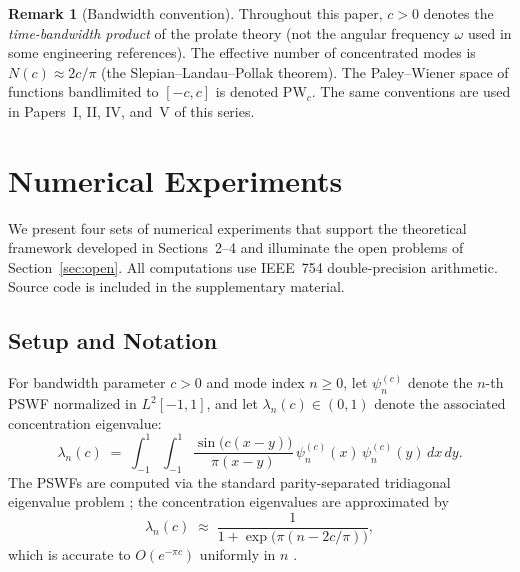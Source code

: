\documentclass[12pt,a4paper]{amsart}
\theoremstyle{definition}
\newtheorem{remark}[theorem]{Remark}
\begin{document}
\begin{remark}[Bandwidth convention]
\label{rem:bandwidth-convention}
Throughout this paper, $c > 0$ denotes the \emph{time-bandwidth product}
of the prolate theory (not the angular frequency $\omega$ used in some
engineering references). The effective number of concentrated modes is
$N(c) \approx 2c/\pi$ (the Slepian--Landau--Pollak theorem). The
Paley--Wiener space of functions bandlimited to $[-c,c]$ is denoted
$\mathrm{PW}_c$. The same conventions are used in Papers~I, II, IV, and~V
of this series.
\end{remark}

\section{Numerical Experiments}
\label{sec:numerics}

We present four sets of numerical experiments that support the
theoretical framework developed in Sections~2--4 and illuminate
the open problems of Section~\ref{sec:open}.
All computations use IEEE~754 double-precision arithmetic.
Source code is included in the supplementary material.

\subsection{Setup and Notation}
\label{ssec:setup}

For bandwidth parameter $c > 0$ and mode index $n \geq 0$, let
$\psi_n^{(c)}$ denote the $n$-th PSWF normalized in $L^2[-1,1]$,
and let $\lambda_n(c) \in (0,1)$ denote the associated concentration
eigenvalue:
\begin{equation}
\label{eq:concentration}
\lambda_n(c)
\;=\;
\int_{-1}^{1}\!\int_{-1}^{1}
\frac{\sin\bigl(c(x-y)\bigr)}{\pi(x-y)}\,
\psi_n^{(c)}(x)\,\psi_n^{(c)}(y)\,dx\,dy.
\end{equation}
The PSWFs are computed via the standard parity-separated
tridiagonal eigenvalue problem \cite{Slepian1978,Osipov2013};
the concentration eigenvalues are approximated by
\begin{equation}
\label{eq:lambda-approx}
\lambda_n(c)
\;\approx\;
\frac{1}{1+\exp\!\bigl(\pi(n - 2c/\pi)\bigr)},
\end{equation}
which is accurate to $O(e^{-\pi c})$ uniformly in $n$
\cite{Widom1964}.
\end{document}

